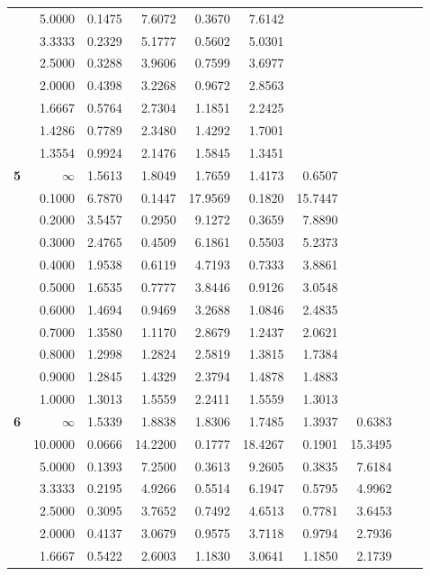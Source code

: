 \begin{table}[!htb]
\begin{center}
{\begin{tabular}{|c||r|r|r|r|r|r|r|r|r|}
&5.0000&0.1475&7.6072&0.3670&7.6142&     &     &     &     \\
&3.3333&0.2329&5.1777&0.5602&5.0301&     &     &     &     \\
&2.5000&0.3288&3.9606&0.7599&3.6977&     &     &     &     \\
&2.0000&0.4398&3.2268&0.9672&2.8563&     &     &     &     \\
&1.6667&0.5764&2.7304&1.1851&2.2425&     &     &     &     \\
&1.4286&0.7789&2.3480&1.4292&1.7001&     &     &     &     \\
&1.3554&0.9924&2.1476&1.5845&1.3451&     &     &     &     \\ \hline
\textbf{ 5}&$\infty$&1.5613&1.8049&1.7659&1.4173&0.6507&     &     &     \\
&0.1000&6.7870&0.1447&17.9569&0.1820&15.7447&     &     &     \\
&0.2000&3.5457&0.2950&9.1272&0.3659&7.8890&     &     &     \\
&0.3000&2.4765&0.4509&6.1861&0.5503&5.2373&     &     &     \\
&0.4000&1.9538&0.6119&4.7193&0.7333&3.8861&     &     &     \\
&0.5000&1.6535&0.7777&3.8446&0.9126&3.0548&     &     &     \\
&0.6000&1.4694&0.9469&3.2688&1.0846&2.4835&     &     &     \\
&0.7000&1.3580&1.1170&2.8679&1.2437&2.0621&     &     &     \\
&0.8000&1.2998&1.2824&2.5819&1.3815&1.7384&     &     &     \\
&0.9000&1.2845&1.4329&2.3794&1.4878&1.4883&     &     &     \\
&1.0000&1.3013&1.5559&2.2411&1.5559&1.3013&     &     &     \\ \hline
\textbf{ 6}&$\infty$&1.5339&1.8838&1.8306&1.7485&1.3937&0.6383&     &     \\
&10.0000&0.0666&14.2200&0.1777&18.4267&0.1901&15.3495&     &     \\
&5.0000&0.1393&7.2500&0.3613&9.2605&0.3835&7.6184&     &     \\
&3.3333&0.2195&4.9266&0.5514&6.1947&0.5795&4.9962&     &     \\
&2.5000&0.3095&3.7652&0.7492&4.6513&0.7781&3.6453&     &     \\
&2.0000&0.4137&3.0679&0.9575&3.7118&0.9794&2.7936&     &     \\
&1.6667&0.5422&2.6003&1.1830&3.0641&1.1850&2.1739&     &     \\

\end{tabular}}
\end{center}
\end{table}
